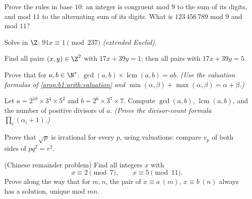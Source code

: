 \begin{exercise}[$\star$]\label{exo:b1:arith:2}
Prove the  rules in base $10$: an integer is congruent mod
$9$ to the sum of its digits, and mod $11$ to the alternating sum of
its digits. What is $123\,456\,789$ mod $9$ and mod $11$?
\end{exercise}

\begin{exercise}[$\star$]\label{exo:b1:arith:3}
Solve in $\Z$: $91x \equiv 1 \pmod{237}$ \emph{(extended Euclid)}.
\end{exercise}

\begin{exercise}[$\star$]\label{exo:b1:arith:4}
Find all pairs $(x, y) \in \Z^2$ with $17x + 39y = 1$; then all pairs
with $17 x + 39 y = 5$.
\end{exercise}

\begin{exercise}[$\star\star$]\label{exo:b1:arith:5}
Prove that for $a, b \in \N^*$: $\gcd(a,b) \times
\operatorname{lcm}(a,b) = ab$. \emph{(Use the valuation formulas of
\cref{prop:b1:arith:valuation} and $\min(\alpha,\beta) +
\max(\alpha,\beta) = \alpha + \beta$.)}
\end{exercise}

\begin{exercise}[$\star\star$]\label{exo:b1:arith:6}
Let $a = 2^{10} \times 3^4 \times 5^2$ and $b = 2^6 \times 3^7 \times
7$. Compute $\gcd(a, b)$, $\operatorname{lcm}(a,b)$, and the number of
positive divisors of $a$. \emph{(Prove the divisor-count formula
$\prod_i (\alpha_i + 1)$.)}
\end{exercise}

\begin{exercise}[$\star\star$]\label{exo:b1:arith:7}
Prove that $\sqrt p$ is irrational for every  $p$, using
valuations: compare $v_p$ of both sides of $p q^2 = r^2$.
\end{exercise}

\begin{exercise}[$\star\star$]\label{exo:b1:arith:8}
(Chinese remainder problem) Find all integers $x$ with
\[
x \equiv 2 \pmod 7, \qquad x \equiv 5 \pmod{11}.
\]
Prove along the way that for  $m, n$, the pair of 
$x \equiv a \ (m)$, $x \equiv b\ (n)$ always has a solution, unique
mod $mn$.
\end{exercise}

